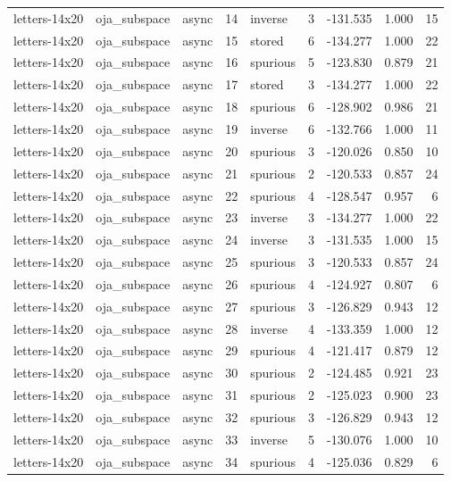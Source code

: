 \begin{tabular}{lllrlrrrr}
letters-14x20 & oja\_subspace & async & 14 & inverse & 3 & -131.535 & 1.000 & 15 \\
letters-14x20 & oja\_subspace & async & 15 & stored & 6 & -134.277 & 1.000 & 22 \\
letters-14x20 & oja\_subspace & async & 16 & spurious & 5 & -123.830 & 0.879 & 21 \\
letters-14x20 & oja\_subspace & async & 17 & stored & 3 & -134.277 & 1.000 & 22 \\
letters-14x20 & oja\_subspace & async & 18 & spurious & 6 & -128.902 & 0.986 & 21 \\
letters-14x20 & oja\_subspace & async & 19 & inverse & 6 & -132.766 & 1.000 & 11 \\
letters-14x20 & oja\_subspace & async & 20 & spurious & 3 & -120.026 & 0.850 & 10 \\
letters-14x20 & oja\_subspace & async & 21 & spurious & 2 & -120.533 & 0.857 & 24 \\
letters-14x20 & oja\_subspace & async & 22 & spurious & 4 & -128.547 & 0.957 & 6 \\
letters-14x20 & oja\_subspace & async & 23 & inverse & 3 & -134.277 & 1.000 & 22 \\
letters-14x20 & oja\_subspace & async & 24 & inverse & 3 & -131.535 & 1.000 & 15 \\
letters-14x20 & oja\_subspace & async & 25 & spurious & 3 & -120.533 & 0.857 & 24 \\
letters-14x20 & oja\_subspace & async & 26 & spurious & 4 & -124.927 & 0.807 & 6 \\
letters-14x20 & oja\_subspace & async & 27 & spurious & 3 & -126.829 & 0.943 & 12 \\
letters-14x20 & oja\_subspace & async & 28 & inverse & 4 & -133.359 & 1.000 & 12 \\
letters-14x20 & oja\_subspace & async & 29 & spurious & 4 & -121.417 & 0.879 & 12 \\
letters-14x20 & oja\_subspace & async & 30 & spurious & 2 & -124.485 & 0.921 & 23 \\
letters-14x20 & oja\_subspace & async & 31 & spurious & 2 & -125.023 & 0.900 & 23 \\
letters-14x20 & oja\_subspace & async & 32 & spurious & 3 & -126.829 & 0.943 & 12 \\
letters-14x20 & oja\_subspace & async & 33 & inverse & 5 & -130.076 & 1.000 & 10 \\
letters-14x20 & oja\_subspace & async & 34 & spurious & 4 & -125.036 & 0.829 & 6 \\

\end{tabular}
